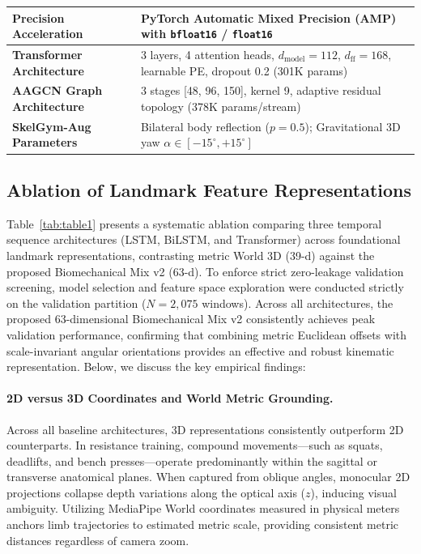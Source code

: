 \documentclass[runningheads]{llncs}
\begin{document}
\begin{table}[!t]
{\begin{tabular}{l l}
\textbf{Precision Acceleration}    & PyTorch Automatic Mixed Precision (AMP) with \texttt{bfloat16} / \texttt{float16} \\
\midrule
\textbf{Transformer Architecture}  & 3 layers, 4 attention heads, $d_{\text{model}} = 112$, $d_{\text{ff}} = 168$, learnable PE, dropout 0.2 (301K params) \\
\textbf{AAGCN Graph Architecture}  & 3 stages [48, 96, 150], kernel 9, adaptive residual topology (378K params/stream) \\
\textbf{SkelGym-Aug Parameters}    & Bilateral body reflection ($p=0.5$); Gravitational 3D yaw $\alpha \in [-15^\circ, +15^\circ]$ \\
\bottomrule
\end{tabular}
}
\end{table}

\subsection{Ablation of Landmark Feature Representations}
Table~\ref{tab:table1} presents a systematic ablation comparing three temporal sequence architectures (LSTM, BiLSTM, and Transformer) across foundational landmark representations, contrasting metric World 3D (39-d) against the proposed Biomechanical Mix v2 (63-d). To enforce strict zero-leakage validation screening, model selection and feature space exploration were conducted strictly on the validation partition ($N=2,075$ windows). Across all architectures, the proposed 63-dimensional Biomechanical Mix v2 consistently achieves peak validation performance, confirming that combining metric Euclidean offsets with scale-invariant angular orientations provides an effective and robust kinematic representation. Below, we discuss the key empirical findings:

\paragraph{2D versus 3D Coordinates and World Metric Grounding.} Across all baseline architectures, 3D representations consistently outperform 2D counterparts. In resistance training, compound movements---such as squats, deadlifts, and bench presses---operate predominantly within the sagittal or transverse anatomical planes. When captured from oblique angles, monocular 2D projections collapse depth variations along the optical axis ($z$), inducing visual ambiguity. Utilizing MediaPipe World coordinates measured in physical meters anchors limb trajectories to estimated metric scale, providing consistent metric distances regardless of camera zoom.
\end{document}
